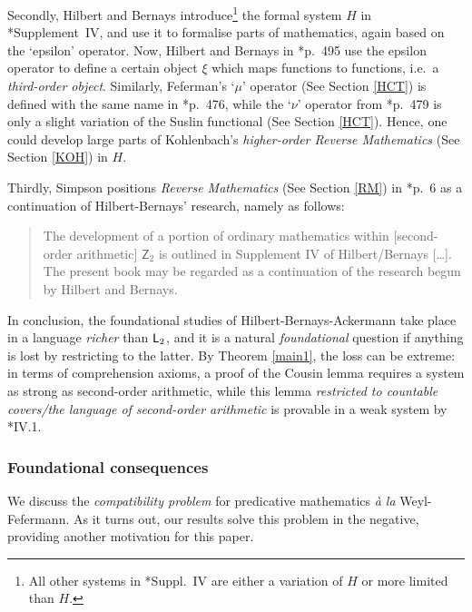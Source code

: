 \documentclass[reqno]{amsart}
\def\L{\textsf{\textup{L}}}
\numberwithin{equation}{section}
\numberwithin{thm}{section}
\begin{document}
\smallskip

Secondly, Hilbert and Bernays introduce\footnote{All other systems in \cite{hillebilly2}*{Suppl.~IV} are either a variation of $H$ or more limited than $H$.} the formal system $H$ in \cite{hillebilly2}*{Supplement~IV}, and use it to formalise parts of mathematics, again based on the `epsilon' operator.  
Now, Hilbert and Bernays in \cite{hillebilly2}*{p.\ 495} use the epsilon operator to define a certain object $\xi$ which maps functions to functions, i.e.\ a \emph{third-order object}.  %
Similarly, Feferman's `$\mu$' operator (See Section \ref{HCT}) is defined with the same name in \cite{hillebilly2}*{p.\ 476}, while the `$\nu$' operator from \cite{hillebilly2}*{p.\ 479} is only a slight variation of the Suslin functional (See Section \ref{HCT}).  
Hence, one could develop large parts of Kohlenbach's \emph{higher-order Reverse Mathematics} (See Section \ref{KOH}) in $H$.

\smallskip

Thirdly, Simpson positions \emph{Reverse Mathematics} (See Section \ref{RM}) in \cite{simpson2}*{p.\ 6} as a continuation of Hilbert-Bernays' research, namely as follows:
\begin{quote}
The development of a portion of ordinary
mathematics within [second-order arithmetic] $\textsf{Z}_{2}$ is outlined in Supplement IV of Hilbert/Bernays [\dots]. The present book may be regarded as a continuation of the research
begun by Hilbert and Bernays. 
\end{quote}
In conclusion, the foundational studies of Hilbert-Bernays-Ackermann take place in a language \emph{richer} than $\L_{2}$, 
and it is a natural \emph{foundational} question if anything is lost by restricting to the latter.  By Theorem \ref{main1}, the loss can be extreme: in terms of comprehension axioms, a proof of the Cousin lemma requires a system as strong as second-order arithmetic, 
while this lemma \emph{restricted to countable covers/the language of second-order arithmetic} is provable in a weak system by \cite{simpson2}*{IV.1}. 

\subsubsection{Foundational consequences}\label{comp}
We discuss the \emph{compatibility problem} for predicative mathematics \emph{\`a la} Weyl-Fefermann.  
As it turns out, our results solve this problem in the negative, providing another motivation for 
this paper.  
\end{document}
